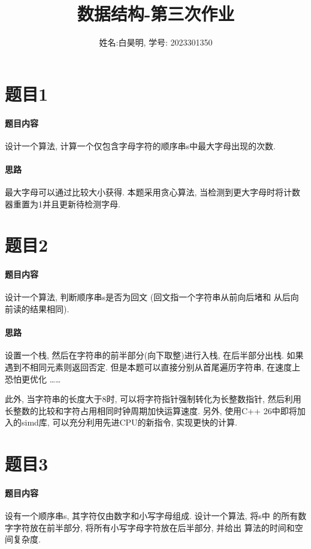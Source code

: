 \documentclass[a4paper]{article}
\title{数据结构-第三次作业}
\author{姓名:白昊明, 学号: 2023301350}
\begin{document}
\maketitle
\section*{题目1}

\paragraph*{题目内容} 设计一个算法, 计算一个仅包含字母字符的顺序串s中最大字母出现的次数.

\paragraph*{思路} 最大字母可以通过比较大小获得. 本题采用贪心算法, 当检测到更大字母时将计数器重置为1并且更新待检测字母.



\section*{题目2}

\paragraph*{题目内容} 设计一个算法, 判断顺序串s是否为回文 (回文指一个字符串从前向后堵和
从后向前读的结果相同).

\paragraph*{思路} 设置一个栈, 然后在字符串的前半部分(向下取整)进行入栈, 在后半部分出栈. 如果遇到不相同元素则返回否定. 但是本题可以直接分别从首尾遍历字符串, 在速度上恐怕更优化 \dots \dots

此外, 当字符串的长度大于8时, 可以将字符指针强制转化为长整数指针, 然后利用长整数的比较和字符占用相同时钟周期加快运算速度. 另外, 使用C++ 26中即将加入的simd库, 可以充分利用先进CPU的新指令, 实现更快的计算.



\section*{题目3}
\paragraph*{题目内容} 设有一个顺序串s, 其字符仅由数字和小写字母组成. 设计一个算法, 将s中
的所有数字字符放在前半部分, 将所有小写字母字符放在后半部分, 并给出
算法的时间和空间复杂度.
\end{document}
